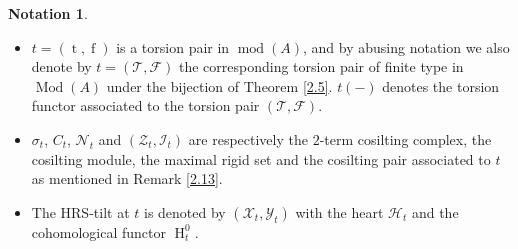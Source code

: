 \documentclass[12pt]{amsart}
\numberwithin{equation}{section}
\theoremstyle{definition}
\newtheorem{notation}[lemma]{Notation}
\DeclareMathOperator{\Mod}{Mod}
\DeclareMathOperator{\modd}{mod}
\DeclareMathOperator{\ts}{t}
\DeclareMathOperator{\fs}{f}
\DeclareMathOperator{\HH}{H}
\newtheorem*{theorem 0*}{Theorem}
\newtheorem*{theorem a*}{Theorem A}
\newtheorem*{theorem b*}{Theorem B}
\numberwithin{diagram}{section}
\begin{document}
	\begin{notation}\label{2.17}
	\begin{itemize}
	\item
	$t=(\ts,\fs)$ is a torsion pair in $\modd(A)$, and by abusing notation we also denote by $t=(\mathcal{T},\mathcal{F})$ the corresponding torsion pair of finite type in $\Mod(A)$ under the bijection of Theorem \ref{2.5}. $t(-)$ denotes the torsion functor associated to the torsion pair $(\mathcal{T},\mathcal{F})$.
	\item
	$\sigma_t$, $C_t$, $\mathcal{N}_t$ and $(\mathcal{Z}_t,\mathcal{I}_t)$ are respectively the $2$-term cosilting complex, the cosilting module, the maximal rigid set and the cosilting pair associated to $t$ as mentioned in Remark \ref{2.13}.
	\item
	The HRS-tilt at $t$ is denoted by $(\mathcal{X}_t,\mathcal{Y}_t)$ with the heart $\mathcal{H}_t$ and the cohomological functor $\HH^0_t$.
	\end{itemize}
	\end{notation}
	
\end{document}
